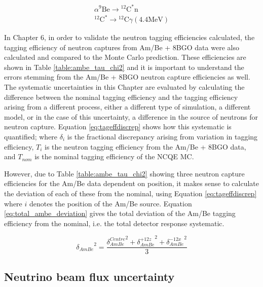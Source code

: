 \begin{equation}
    \begin{gathered}
    \alpha{ }^9 \mathrm{Be} \longrightarrow{ }^{12} \mathrm{C}^* \mathrm{n} \\
    { }^{12} \mathrm{C}^* \longrightarrow{ }^{12} \mathrm{C} \gamma(4.4 \mathrm{MeV})
    \end{gathered}
\label{eq:ambe_decay_2}
\end{equation}

In Chapter 6, in order to validate the neutron tagging efficiencies calculated, the tagging efficiency of neutron captures from Am/Be + 8BGO data were also calculated and compared to the Monte Carlo prediction. These efficiencies are shown in Table \ref{table:ambe_tau_chi2} and it is important to understand the errors stemming from the Am/Be + 8BGO neutron capture efficiencies as well. The systematic uncertainties in this Chapter are evaluated by calculating the difference between the nominal tagging efficiency and the tagging efficiency arising from a different process, either a different type of simulation, a different model, or in the case of this uncertainty, a difference in the source of neutrons for neutron capture. Equation \ref{eq:tageffdiscrep} shows how this systematic is quantified; where $\delta_{i}$ is the fractional discrepancy arising from variation in tagging efficiency, $T_{i}$ is the neutron tagging efficiency from the Am/Be + 8BGO data, and $T_{nom}$ is the nominal tagging efficiency of the NCQE MC. 

However, due to Table \ref{table:ambe_tau_chi2} showing three neutron capture efficiencies for the Am/Be data dependent on position, it makes sense to calculate the deviation of each of these from the nominal, using Equation \ref{eq:tageffdiscrep} where $i$ denotes the position of the Am/Be source. Equation \ref{eq:total_ambe_deviation} gives the total deviation of the Am/Be tagging efficiency from the nominal, i.e. the total detector response systematic.

\begin{equation}
    {\delta_{AmBe}}^2= \frac{{\delta_{AmBe}^{Centre}}^2 + {\delta_{AmBe}^{+12z}}^2 + {\delta_{AmBe}^{-12x}}^2}{3} 
\label{eq:total_ambe_deviation}
\end{equation}




\subsection{Neutrino beam flux uncertainty}

